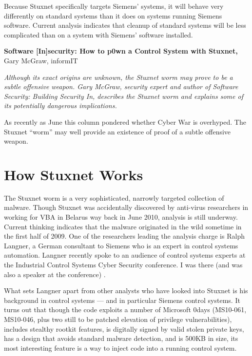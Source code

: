 \documentclass[10pt,twoside,openleft]{memoir}
\begin{document}
Because Stuxnet specifically targets Siemens' systems, it will behave very differently on standard systems than it does on systems running Siemens software. Current analysis indicates that cleanup of standard systems will be less complicated than on a system with Siemens' software installed.

\pagebreak

\noindent \textbf{Software [In]security: How to p0wn a Control System with Stuxnet,} Gary McGraw, informIT

\vskip 0.2in

\noindent \textit{Although its exact origins are unknown, the Stuxnet worm may prove to be a subtle offensive weapon. Gary McGraw, security expert and author of Software Security: Building Security In, describes the Stuxnet worm and explains some of its potentially dangerous implications.}

\vskip 0.2in

\noindent As recently as June this column pondered whether Cyber War is overhyped. The Stuxnet ``worm'' may well provide an existence of proof of a subtle offensive weapon.

\section{How Stuxnet Works}

The Stuxnet worm is a very sophisticated, narrowly targeted collection of malware. Though Stuxnet was accidentally discovered by anti-virus researchers in working for VBA in Belarus way back in June 2010, analysis is still underway. Current thinking indicates that the malware originated in the wild sometime in the first half of 2009. One of the researchers leading the analysis charge is Ralph Langner, a German consultant to Siemens who is an expert in control systems automation. Langner recently spoke to an audience of control systems experts at the Industrial Control Systems Cyber Security conference. I was there (and was also a speaker at the conference) .

What sets Langner apart from other analysts who have looked into Stuxnet is his background in control systems — and in particular Siemens control systems. It turns out that though the code exploits a number of Microsoft 0days (MS10-061, MS10-046, plus two still to be patched elevation of privilege vulnerabilities), includes stealthy rootkit features, is digitally signed by valid stolen private keys, has a design that avoids standard malware detection, and is 500KB in size, its most interesting feature is a way to inject code into a running control system.
\end{document}
